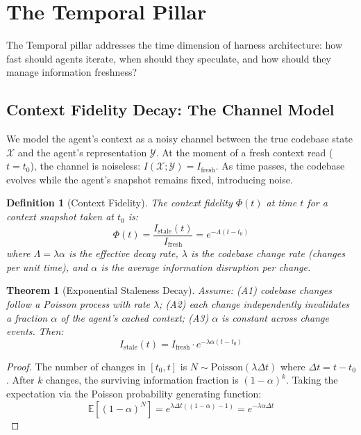 \documentclass[11pt, a4paper, logo, copyright]{googledeepmind}
\newtheorem{definition}{Definition}[section]
\newtheorem{theorem}{Theorem}[section]
\begin{document}
\section{The Temporal Pillar}
\label{sec:temporal}

The Temporal pillar addresses the time dimension of harness architecture: how fast should agents iterate, when should they speculate, and how should they manage information freshness?

\subsection{Context Fidelity Decay: The Channel Model}

We model the agent's context as a noisy channel between the true codebase state $\mathcal{X}$ and the agent's representation $\mathcal{Y}$. At the moment of a fresh context read ($t = t_0$), the channel is noiseless: $I(\mathcal{X}; \mathcal{Y}) = I_{\mathrm{fresh}}$. As time passes, the codebase evolves while the agent's snapshot remains fixed, introducing noise.

\begin{definition}[Context Fidelity]
\label{def:fidelity}
The context fidelity $\Phi(t)$ at time $t$ for a context snapshot taken at $t_0$ is:
\begin{equation}
    \Phi(t) = \frac{I_{\mathrm{stale}}(t)}{I_{\mathrm{fresh}}} = e^{-\Lambda(t - t_0)}
\end{equation}
where $\Lambda = \lambda \alpha$ is the effective decay rate, $\lambda$ is the codebase change rate (changes per unit time), and $\alpha$ is the average information disruption per change.
\end{definition}

\begin{theorem}[Exponential Staleness Decay]
\label{thm:staleness}
Assume: (A1) codebase changes follow a Poisson process with rate $\lambda$; (A2) each change independently invalidates a fraction $\alpha$ of the agent's cached context; (A3) $\alpha$ is constant across change events. Then:
\begin{equation}
    I_{\mathrm{stale}}(t) = I_{\mathrm{fresh}} \cdot e^{-\lambda\alpha(t - t_0)}
\end{equation}
\end{theorem}

\begin{proof}
The number of changes in $[t_0, t]$ is $N \sim \mathrm{Poisson}(\lambda\Delta t)$ where $\Delta t = t - t_0$. After $k$ changes, the surviving information fraction is $(1-\alpha)^k$. Taking the expectation via the Poisson probability generating function:
\begin{equation}
    \mathbb{E}[(1-\alpha)^N] = e^{\lambda\Delta t((1-\alpha) - 1)} = e^{-\lambda\alpha\Delta t}
\end{equation}
\end{proof}
\end{document}

